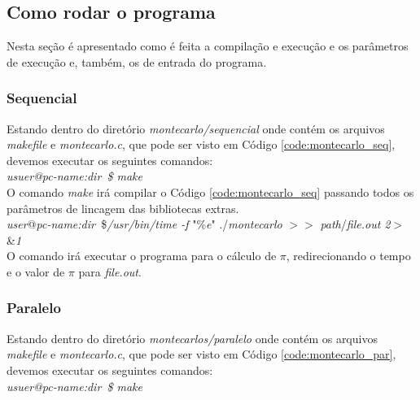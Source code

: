 \documentclass[11pt,twoside]{article}
\begin{document}
    \subsection{Como rodar o programa}
    
        Nesta seção é apresentado como é feita a compilação e execução e os parâmetros de execução
        e, também, os de entrada do programa.
    
        \subsubsection{Sequencial}
        
            Estando dentro do diretório {\it montecarlo/sequencial} onde contém os arquivos
            {\it makefile} e {\it montecarlo.c}, que pode ser visto em Código
            \ref{code:montecarlo_seq}, devemos executar os seguintes comandos:\\
        
            {\it usuer@pc-name:dir~\$ make}\\
            
            O comando {\it make} irá compilar o Código \ref{code:montecarlo_seq} passando
            todos os parâmetros de lincagem das bibliotecas extras.\\
            
            {\it user}@{\it pc-name:dir~}\${\it /usr/bin/time -f }"\%{\it e}" ./{\it montecarlo}
            $>>$ {\it path}/{\it file.out 2}$>$\&{\it 1} \\
            
            O comando irá executar o programa para o cálculo de $\pi$, redirecionando o tempo
            e o valor de $\pi$ para {\it file.out}.\\
        
        \subsubsection{Paralelo}
        
            Estando dentro do diretório {\it montecarlos/paralelo} onde contém os arquivos 
            {\it makefile} e {\it montecarlo.c}, que pode ser visto em Código 
            \ref{code:montecarlo_par}, devemos executar os seguintes comandos:\\
            
            {\it usuer@pc-name:dir~\$ make}\\
            
\end{document}
